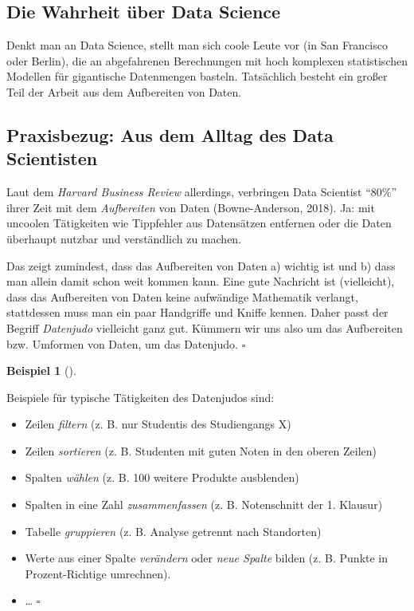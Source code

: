 \documentclass[
  letterpaper,
]{scrbook}
\providecommand{\tightlist}{%
  \setlength{\itemsep}{0pt}\setlength{\parskip}{0pt}}\usepackage{longtable,booktabs,array}
\theoremstyle{definition}
\newtheorem{example}{Beispiel}[chapter]
\theoremstyle{definition}
\theoremstyle{definition}
\theoremstyle{remark}
\begin{document}
\subsection{Die Wahrheit über Data
Science}\label{die-wahrheit-uxfcber-data-science}

Denkt man an Data Science, stellt man sich coole Leute vor (in San
Francisco oder Berlin), die an abgefahrenen Berechnungen mit hoch
komplexen statistischen Modellen für gigantische Datenmengen basteln.
Tatsächlich besteht ein großer Teil der Arbeit aus dem Aufbereiten von
Daten.

\subsection{Praxisbezug: Aus dem Alltag des Data
Scientisten}\label{praxisbezug-aus-dem-alltag-des-data-scientisten}

Laut dem \emph{Harvard Business Review} allerdings, verbringen Data
Scientist ``80\%'' ihrer Zeit mit dem \emph{Aufbereiten} von Daten
(Bowne-Anderson, 2018). Ja: mit uncoolen Tätigkeiten wie Tippfehler aus
Datensätzen entfernen oder die Daten überhaupt nutzbar und verständlich
zu machen.

Das zeigt zumindest, dass das Aufbereiten von Daten a) wichtig ist und
b) dass man allein damit schon weit kommen kann. Eine gute Nachricht ist
(vielleicht), dass das Aufbereiten von Daten keine aufwändige Mathematik
verlangt, stattdessen muss man ein paar Handgriffe und Kniffe kennen.
Daher passt der Begriff \emph{Datenjudo} vielleicht ganz gut. Kümmern
wir uns also um das Aufbereiten bzw. Umformen von Daten, um das
Datenjudo. \(\square\)

\begin{example}[]\protect\hypertarget{exm-datenjudo}{}\label{exm-datenjudo}

Beispiele für typische Tätigkeiten des Datenjudos sind:

\begin{itemize}
\tightlist
\item
  Zeilen \emph{filtern} (z. B. nur Studentis des Studiengangs X)
\item
  Zeilen \emph{sortieren} (z. B. Studenten mit guten Noten in den oberen
  Zeilen)
\item
  Spalten \emph{wählen} (z. B. 100 weitere Produkte ausblenden)
\item
  Spalten in eine Zahl \emph{zusammenfassen} (z. B. Notenschnitt der 1.
  Klausur)
\item
  Tabelle \emph{gruppieren} (z. B. Analyse getrennt nach Standorten)
\item
  Werte aus einer Spalte \emph{verändern} oder \emph{neue Spalte} bilden
  (z. B. Punkte in Prozent-Richtige umrechnen).
\item
  \ldots{} \(\square\)
\end{itemize}

\end{example}
\end{document}
